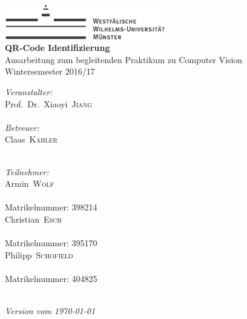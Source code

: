 
\begin{titlepage}
\begin{center}
\includegraphics[height=1.5cm, keepaspectratio]{images/Logo_WWU_Muenster.pdf} \\[1.0cm]
{\huge\sffamily\bfseries QR-Code Identifizierung}\\[0.5cm]
{\large Ausarbeitung zum begleitenden Praktikum zu Computer Vision}\\[0.5cm]
{Wintersemester 2016/17}\\[3.0cm]
\centering
\begin{minipage}[t]{0.36\textwidth}
	{\large \textit{Veranstalter:}}\\[5pt]
	{\Large Prof.\ Dr.\ Xiaoyi\ \textsc{Jiang}}\\[4pt]
	{}\\[1.0cm]
	{\large \textit{Betreuer:}}\\[5pt]
	{\Large Claas\ \textsc{Kähler}}\\[4pt]
	{}\\[0.5cm]
\end{minipage}%
\hspace{20pt}
\begin{minipage}[t]{0.36\textwidth}
	{\large \textit{Teilnehmer:}}\\[5pt]
	{\Large Armin\ \textsc{Wolf}}\\[4pt]
    {}\\[4pt]
    {\large Matrikelnummer: 398214}\\[0.5cm]   
	{\Large Christian\ \textsc{Esch}}\\[4pt]
	{}\\[4pt]
	{\large Matrikelnummer: 395170}\\[0.5cm] 	 
	{\Large Philipp\ \textsc{Schofield}}\\[4pt]
	{}\\[4pt] 
	{\large Matrikelnummer: 404825}\\[0.5cm]
\end{minipage}
\\[2cm]
{\large\itshape Version vom \today}\\
\end{center}


\end{titlepage}
